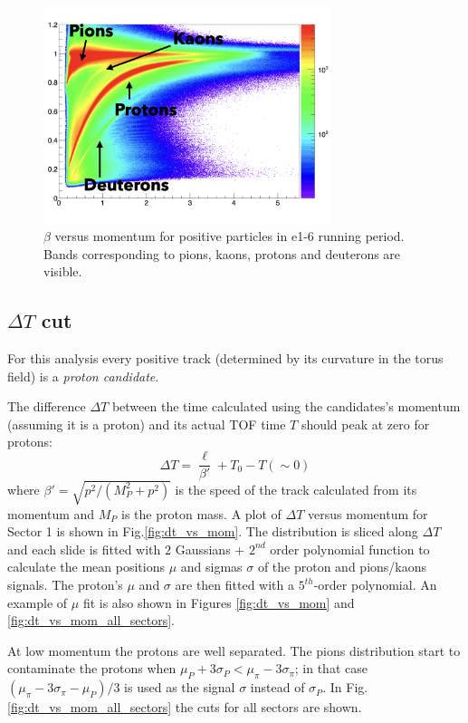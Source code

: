 \begin{figure}[h]
  \centering
		\includegraphics[width=0.75\textwidth ]{img/beta_vs_mom.png}
		\caption{ $\beta$ versus momentum for positive particles in e1-6 running period. Bands
                    corresponding to pions, kaons, protons and deuterons are visible.}
 		\label{fig:beta_vs_mom}
\end{figure}

\subsection{$\Delta T$ cut}
\label{sec:clas_timing}

For this analysis every positive track (determined by its curvature in the torus field) 
is a {\it proton candidate}.

The difference $\Delta T$ between the time calculated using
the candidates's momentum (assuming it is a proton) and its actual TOF time $T$ 
should peak at zero for protons:
\begin{equation}
 \label{eq:protondt}
  \Delta T = \frac{\ell}{\beta'} + T_{0} - T (\sim0 )
\end{equation}
where $\beta' = \sqrt{ p^2 /( M_P^2 + p^2 ) }$ is the speed of the track calculated from its
momentum and $M_P$ is the proton mass. 
A plot of $\Delta T$ versus momentum for Sector 1 is shown in 
Fig.\ref{fig:dt_vs_mom}. The distribution is sliced along $\Delta T$ and each slide is fitted
with $2$ Gaussians + $2^{nd}$ order polynomial function to calculate the mean 
positions $\mu$ and sigmas $\sigma$ of the proton and pions/kaons signals. 
The proton's $\mu$ and $\sigma$ are then fitted with a $5^{th}$-order polynomial. 
An example of $\mu$ fit is also shown in 
Figures \ref{fig:dt_vs_mom} and \ref{fig:dt_vs_mom_all_sectors}.

At low momentum the protons are well separated.  The pions distribution 
start to contaminate the protons when
$\mu_{P} + 3\sigma_{P} < \mu_{\pi} - 3\sigma_{\pi}$;  in that case 
$(\mu_{\pi} - 3\sigma_{\pi} - \mu_{P})/3$ is used as the signal $\sigma$ instead of $\sigma_{P}$.
In Fig.\ref{fig:dt_vs_mom_all_sectors} the cuts for all sectors are shown. 

